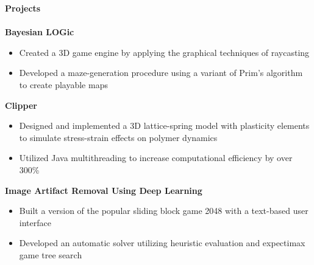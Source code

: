\documentclass{article}
\begin{document}
\noindent
\textbf{\Large Projects}\\[-2mm]
\HRule\\
\textbf{Bayesian LOGic} 
\begin{itemize}
\vspace{-2.5mm}
\item Created a 3D game engine by applying the graphical techniques of raycasting
\vspace{-2.5mm}
\item Developed a maze-generation procedure using a variant of Prim's algorithm to create playable maps
\end{itemize}
\vspace{-1.8mm}
\noindent
\textbf{Clipper} 
\begin{itemize}
\vspace{-2.5mm}
\item Designed and implemented a 3D lattice-spring model with plasticity elements to simulate stress-strain effects on polymer dynamics
\vspace{-2.5mm}
\item Utilized Java multithreading to increase computational efficiency by over 300\%
\end{itemize}
\vspace{-1.8mm}

\noindent
\textbf{Image Artifact Removal Using Deep Learning}
\begin{itemize}
\vspace{-2.5mm}
\item Built a version of the popular sliding block game 2048 with a text-based user interface
\vspace{-2.5mm}
\item Developed an automatic solver utilizing heuristic evaluation and expectimax game tree search
\end{itemize}

\end{document}
